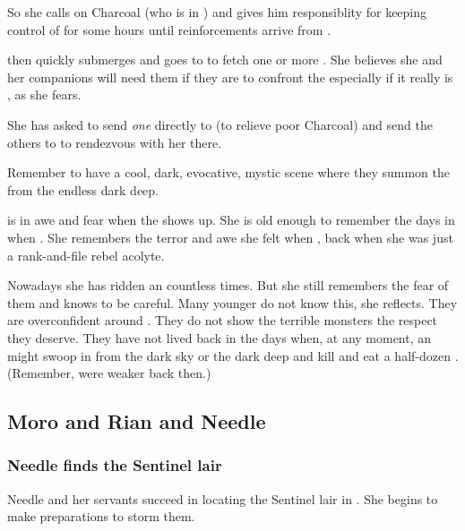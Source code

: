 So she calls on Charcoal (who is in \Forclin) and gives him responsiblity for keeping control of \Forclin{} for some hours until reinforcements arrive from \Malcur. 

\Achsah{} then quickly submerges and goes to \Nyx{} to fetch one or more \umbrae. 
She believes she and her companions will need them if they are to confront the \dragon\dash especially if it really is \Nzessuacrith, as she fears. 

She has asked \Teshrial{} to send \emph{one} \resphan{} directly to \Forclin{} (to relieve poor Charcoal) and send the others to \Nyx{} to rendezvous with her there. 

Remember to have a cool, dark, evocative, mystic scene where they summon the \umbrae{} from the endless dark deep. 

\Achsah{} is in awe and fear when the \umbra{} shows up. 
She is old enough to remember the days in \Merkyrah{} when . 
She remembers the terror and awe she felt when , back when she was just a rank-and-file rebel acolyte. 

Nowadays she has ridden an \umbra{} countless times. 
But she still remembers the fear of them and knows to be careful. 
Many younger \resphain{} do not know this, she reflects. 
They are overconfident around \umbrae.
They do not show the terrible monsters the respect they deserve. 
They have not lived back in the days when, at any moment, an \umbra{} might swoop in from the dark sky or the dark deep and kill and eat a half-dozen \resphain. 
(Remember, \resphain{} were weaker back then.)










\subsection{Moro and Rian and Needle}





\subsubsection{Needle finds the Sentinel lair}
Needle and her servants succeed in locating the Sentinel lair in \Malcur. She begins to make preparations to storm them. 

